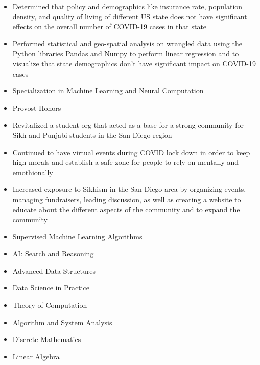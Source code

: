 \documentclass[10pt,a4paper,ragged2e,withhyper]{altacv}
\begin{document}
\begin{paracol}{2}
\divider

\begin{itemize}
\item Determined that policy and demographics like insurance rate, population density, and quality of living of different US state
does not have significant effects on the overall number of COVID-19 cases in that state
\item Performed statistical and geo-spatial analysis on wrangled data using the Python libraries Pandas and Numpy to perform
linear regression and to visualize that state demographics don’t have significant impact on COVID-19 cases
\end{itemize}
 \medskip
\newpage
 
\switchcolumn

 

\begin{itemize}
    \item Specialization in Machine Learning and Neural Computation
    \item Provost Honors
\end{itemize}

\begin{itemize}
\item Revitalized a student org that acted as a base for a strong community for Sikh and Punjabi students in the San Diego region
\item Continued to have virtual events during COVID lock down in order to keep high morals and establish a safe zone for people to rely on mentally and emothionally
\item Increased exposure to Sikhism in the San Diego area by organizing events, managing fundraisers, leading discussion, as well as creating a website to educate about the different aspects of the community  and to expand the community

\end{itemize}

\begin{itemize}
\item Supervised Machine Learning Algorithms   
\item AI: Search and Reasoning   
\item Advanced Data Structures   
\item Data Science in Practice
\item Theory of Computation
\item Algorithm and System Analysis
\item Discrete Mathematics
\item Linear Algebra
\end{itemize}


\end{paracol}
\end{document}
